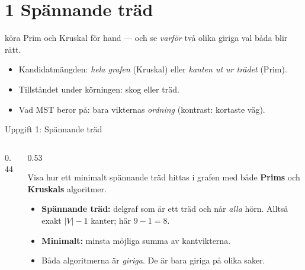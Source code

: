 \section{1 Spännande träd}

{köra Prim och Kruskal för hand — och se \emph{varför} två olika giriga val båda blir rätt.}
{\begin{itemize}\setlength{\itemsep}{1pt}
  \item Kandidatmängden: \emph{hela grafen} (Kruskal) eller \emph{kanten ut ur trädet} (Prim).
  \item Tillståndet under körningen: skog eller träd.
  \item Vad MST beror på: bara vikternas \emph{ordning} (kontrast: kortaste väg).
\end{itemize}}

\begin{frame}{Uppgift 1: Spännande träd}
\begin{columns}[T]
\begin{column}{0.44\textwidth}
\centering

\end{column}
\begin{column}{0.53\textwidth}
\begin{infobox}
Visa hur ett minimalt spännande träd hittas i grafen med både \textbf{Prims} och
\textbf{Kruskals} algoritmer.
\end{infobox}
\small
\begin{itemize}\setlength{\itemsep}{3pt}
  \item \textbf{Spännande träd:} delgraf som är ett träd och når \emph{alla} hörn.
        Alltså exakt $|V|-1$ kanter; här $9-1=8$.
  \item \textbf{Minimalt:} minsta möjliga summa av kantvikterna.
  \item Båda algoritmerna är \emph{giriga}. De är bara giriga på olika saker.
\end{itemize}
\end{column}
\end{columns}
\end{frame}

